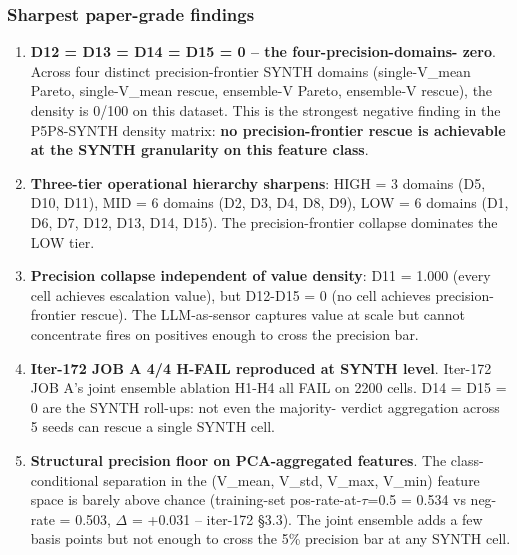 \subsubsection{Sharpest paper-grade findings}
\begin{enumerate}
\item \textbf{D12 = D13 = D14 = D15 = 0 -- the four-precision-domains-
zero}. Across four distinct precision-frontier SYNTH domains
(single-V\_mean Pareto, single-V\_mean rescue, ensemble-V Pareto,
ensemble-V rescue), the density is 0/100 on this dataset. This is
the strongest negative finding in the P5P8-SYNTH density matrix:
\textbf{no precision-frontier rescue is achievable at the SYNTH
granularity on this feature class}.
\item \textbf{Three-tier operational hierarchy sharpens}: HIGH = 3
domains (D5, D10, D11), MID = 6 domains (D2, D3, D4, D8, D9), LOW
= 6 domains (D1, D6, D7, D12, D13, D14, D15). The precision-frontier
collapse dominates the LOW tier.
\item \textbf{Precision collapse independent of value density}: D11
= 1.000 (every cell achieves escalation value), but D12-D15 = 0
(no cell achieves precision-frontier rescue). The LLM-as-sensor
captures value at scale but cannot concentrate fires on positives
enough to cross the precision bar.
\item \textbf{Iter-172 JOB A 4/4 H-FAIL reproduced at SYNTH level}.
Iter-172 JOB A's joint ensemble ablation H1-H4 all FAIL on 2200
cells. D14 = D15 = 0 are the SYNTH roll-ups: not even the majority-
verdict aggregation across 5 seeds can rescue a single SYNTH cell.
\item \textbf{Structural precision floor on PCA-aggregated features}.
The class-conditional separation in the (V\_mean, V\_std, V\_max,
V\_min) feature space is barely above chance (training-set
pos-rate-at-$\tau$=0.5 = 0.534 vs neg-rate = 0.503, $\Delta$ = +0.031
-- iter-172 §3.3). The joint ensemble adds a few basis points but
not enough to cross the 5\% precision bar at any SYNTH cell.
\end{enumerate}

